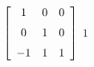 {$\left[ \begin {array}{ccc} 1&0&0\\\noalign{\medskip}0&1&0
\\\noalign{\medskip}-1&1&1\end {array} \right] $} 
{$1$}

  

 

